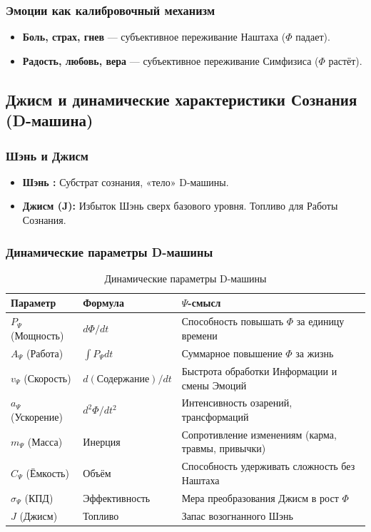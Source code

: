 \documentclass[a4paper,12pt]{article}
\begin{document}
\subsubsection{Эмоции как калибровочный механизм}

\begin{itemize}
	\item \textbf{Боль, страх, гнев} — субъективное переживание Наштаха ($\Phi$ падает).
	\item \textbf{Радость, любовь, вера} — субъективное переживание Симфизиса ($\Phi$ растёт).
\end{itemize}

\subsection{Джисм и динамические характеристики Сознания (D-машина)}

\subsubsection{Шэнь и Джисм}

\begin{itemize}
	\item \textbf{Шэнь :} Субстрат сознания, «тело» D-машины.
	\item \textbf{Джисм (J):} Избыток Шэнь сверх базового уровня. Топливо для Работы Сознания.
\end{itemize}

\subsubsection{Динамические параметры D-машины}

\begin{table}[H]
	\centering
	\begin{tabular}{|p{3cm}|p{3.2cm}|p{7cm}|}
		\hline
		\textbf{Параметр} & \textbf{Формула} & \textbf{$\Psi$-смысл} \\
		\hline
		$P_{\Psi}$ (Мощность) & $d\Phi/dt$ & Способность повышать $\Phi$ за единицу времени \\
		\hline
		$A_{\Psi}$ (Работа) & $\int P_{\Psi} dt$ & Суммарное повышение $\Phi$ за жизнь \\
		\hline
		$v_{\Psi}$ (Скорость) & $d(\text{Содержание})/dt$ & Быстрота обработки Информации и смены Эмоций \\
		\hline
		$a_{\Psi}$ (Ускорение) & $d^2\Phi/dt^2$ & Интенсивность озарений, трансформаций \\
		\hline
		$m_{\Psi}$ (Масса) & Инерция & Сопротивление изменениям (карма, травмы, привычки) \\
		\hline
		$C_{\Psi}$ (Ёмкость) & Объём & Способность удерживать сложность без Наштаха \\
		\hline
		$\sigma_{\Psi}$ (КПД) & Эффективность & Мера преобразования Джисм в рост $\Phi$ \\
		\hline
		$J$ (Джисм) & Топливо & Запас возогнанного Шэнь \\
		\hline
	\end{tabular}
	\caption{Динамические параметры D-машины}
\end{table}
\end{document}
